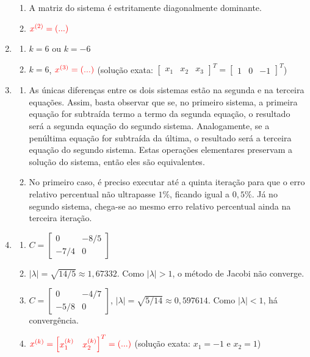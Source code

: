 \documentclass[12pt,a4paper]{article}
\newcommand{\fixme}{{\color{red}(...)}}
\begin{document}
\begin{enumerate}
\begin{enumerate}
\item A matriz do sistema é estritamente diagonalmente dominante.
\item $\color{red}x^{(2)} = \fixme
$
\end{enumerate}
\item \begin{enumerate}
\item $k = 6$ ou $k = -6$
\item $k = 6$, $\color{red} x^{(3)} = \fixme
$ (solução exata: $
\begin{bmatrix}
x_1 & x_2 & x_3
\end{bmatrix}^T
=
\begin{bmatrix}
1 & 0 & -1
\end{bmatrix}^T$)
\end{enumerate}
\item \begin{enumerate}
\item As únicas diferenças entre os dois sistemas estão na segunda e na terceira equações. Assim, basta observar que se, no primeiro sistema, a primeira equação for subtraída termo a termo da segunda equação, o resultado será a segunda equação do segundo sistema. Analogamente, se a penúltima equação for subtraída da última, o resultado será a terceira equação do segundo sistema. Estas operações elementares preservam a solução do sistema, então eles são equivalentes.
\item No primeiro caso, é preciso executar até a quinta iteração para que o erro relativo percentual não ultrapasse $1\%$, ficando igual a $0,5\%$. Já no segundo sistema, chega-se ao mesmo erro relativo percentual ainda na terceira iteração.
\end{enumerate}
\item \begin{enumerate}
\item $C =
\begin{bmatrix}
0 & -8/5 \\
-7/4 & 0
\end{bmatrix}$
\item $|\lambda| = \sqrt{14/5}\approx 1,\!67332$. Como $|\lambda| > 1$, o método de Jacobi não converge.
\item $C =
\begin{bmatrix}
0 & -4/7 \\
-5/8 & 0
\end{bmatrix}$, $|\lambda| = \sqrt{5/14}\approx 0,\!597614$. Como $|\lambda| < 1$, há convergência.
\item $\color{red} x^{(k)} = \begin{bmatrix}
x_1^{(k)} & x_2^{(k)}
\end{bmatrix}^T = \fixme$ (solução exata: $x_1 = -1$ e $x_2 = 1$)
\end{enumerate}


\end{enumerate}
\end{document}
